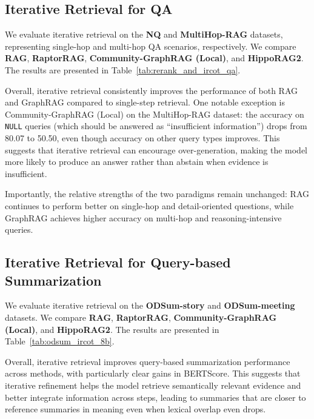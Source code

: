 \subsection{Iterative Retrieval for QA}

We evaluate iterative retrieval on the \textbf{NQ} and \textbf{MultiHop-RAG} datasets, representing single-hop and multi-hop QA scenarios, respectively. We compare \textbf{RAG}, \textbf{RaptorRAG}, \textbf{Community-GraphRAG (Local)}, and \textbf{HippoRAG2}. The results are presented in Table~\ref{tab:rerank_and_ircot_qa}.

Overall, iterative retrieval consistently improves the performance of both RAG and GraphRAG compared to single-step retrieval. One notable exception is Community-GraphRAG (Local) on the MultiHop-RAG dataset: the accuracy on \texttt{NULL} queries (which should be answered as ``insufficient information'') drops from 80.07 to 50.50, even though accuracy on other query types improves. This suggests that iterative retrieval can encourage over-generation, making the model more likely to produce an answer rather than abstain when evidence is insufficient.

Importantly, the relative strengths of the two paradigms remain unchanged: RAG continues to perform better on single-hop and detail-oriented questions, while GraphRAG achieves higher accuracy on multi-hop and reasoning-intensive queries.


\subsection{Iterative Retrieval for Query-based Summarization}
We evaluate iterative retrieval on the \textbf{ODSum-story} and \textbf{ODSum-meeting} datasets. We compare \textbf{RAG}, \textbf{RaptorRAG}, \textbf{Community-GraphRAG (Local)}, and \textbf{HippoRAG2}. The results are presented in Table~\ref{tab:odsum_ircot_8b}.

Overall, iterative retrieval improves query-based summarization performance across methods, with particularly clear gains in BERTScore. This suggests that iterative refinement helps the model retrieve semantically relevant evidence and better integrate information across steps, leading to summaries that are closer to reference summaries in meaning even when lexical overlap even drops.

